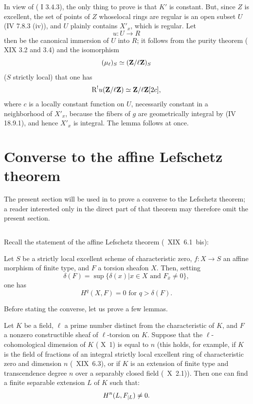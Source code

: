 \enlargethispage{\baselineskip}%
In view of ( I 3.4.3), the only thing to prove is that $K'$ is constant. But, since $Z$ is excellent, the set of points of $Z$ whose\pageoriginale local rings are regular is an open subset $U$ (\EGA IV 7.8.3 \textup{(iv)}), and $U$ plainly contains $X'_x$, which is regular. Let
$$u:U\to R$$
then be the canonical immersion of $U$ into $R$; it follows from the purity theorem ( XIX 3.2 and 3.4) and the isomorphism
$$(\mu_\ell)_S\simeq(\ZZ/\ell\ZZ)_S$$
($S$ strictly local) that one has
$$
\R^!u(\ZZ/\ell\ZZ)\simeq\ZZ/\ell\ZZ[2c],
$$
where $c$ is a locally constant function on $U$, necessarily constant in a neighborhood of $X'_x$, because the fibers of $g$ are geometrically integral by (\EGA IV 18.9.1), and hence $X'_x$ is integral. The lemma follows at once.

\section{Converse to the affine Lefschetz theorem} \label{XIV.3}

The present section will be used in \numero {} to prove a converse to the \og Lefschetz theorem\fg; a reader interested only in the direct part of that theorem may therefore omit the present section.

\subsection{\texorpdfstring{}{XIV.3.1}} \label{XIV.3.1}

Recall the statement of the affine Lefschetz theorem (~XIX~6.1~bis):

Let $S$ be a strictly local excellent scheme of characteristic zero, $f:X\to S$ an affine morphism of finite type, and $F$ a torsion sheaf\pageoriginale on $X$. Then, setting
$$
\delta(F)=\sup\{\delta(x)|x\in X \text{ and } F_{\bar{x}} \neq 0\},
$$
one has
$$
H^q(X, F)=0 \text{ for } q>\delta(F).
$$

Before stating the converse, let us prove a few lemmas.

\begin{lemme} \label{XIV.3.2} Let $K$ be a field, $\ell$ a prime number distinct from the characteristic of $K$, and $F$ a nonzero constructible sheaf of $\ell$-torsion on $K$. Suppose that the $\ell$-cohomological dimension of $K$ (\textup{ X~1}) is equal to $n$ (this holds, for example, if $K$ is the field of fractions of an integral strictly local excellent ring of characteristic zero and dimension $n$ (\textup{~XIX~6.3}), or if $K$ is an extension of finite type and transcendence degree $n$ over a separably closed field (\textup{~X~2.1})). Then one can find a finite separable extension $L$ of $K$ such that:
$$H^n(L, \sisi{F{|L}}{F_{|L}}) \neq 0.
$$
\end{lemme}

